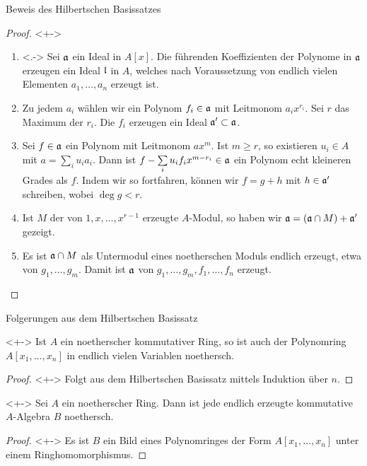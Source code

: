 \begin{frame}{Beweis des Hilbertschen Basissatzes}
	\begin{proof}<+->
		\begin{enumerate}[<+->]
		\item<.->
			Sei \(\mathfrak{a}\) ein Ideal in \(A[x]\). Die führenden Koeffizienten der
			Polynome in \(\mathfrak{a}\) erzeugen ein Ideal \(\mathfrak{l}\) in \(A\), welches
			nach Voraussetzung von endlich vielen Elementen \(a_1, \dotsc, a_n\) erzeugt ist.
		\item
			Zu jedem \(a_i\) wählen wir ein Polynom \(f_i \in \mathfrak{a}\) mit Leitmonom
			\(a_i x^{r_i}\). Sei \(r\) das Maximum der \(r_i\). Die \(f_i\)
			erzeugen ein Ideal \(\mathfrak{a}' \subset \mathfrak{a}\).
		\item
			Sei \(f \in \mathfrak{a}\) ein Polynom mit Leitmonom \(a x^m\).
			Ist \(m \ge r\), so existieren \(u_i \in A\) mit \(a = \sum\limits_i u_i a_i\).
			Dann ist \(f - \sum\limits_i u_i f_i x^{m - r_i} \in \mathfrak{a}\) ein Polynom echt kleineren Grades 
			als \(f\). Indem wir so fortfahren, können wir \(f = g + h\) mit \(h \in \mathfrak{a}'\)
			schreiben, wobei \(\deg g < r\).
		\item
			Ist \(M\) der von \(1, x, \dots, x^{r - 1}\) erzeugte \(A\)-Modul, so haben
			wir \(\mathfrak{a} = (\mathfrak{a} \cap M) + \mathfrak{a}'\) gezeigt.
		\item
			Es ist \(\mathfrak{a} \cap M\) als Untermodul eines noetherschen Moduls endlich erzeugt, 
			etwa von \(g_1, \dotsc, g_m\). Damit ist \(\mathfrak{a}\) von
			\(g_1, \dotsc, g_m, f_1, \dotsc, f_n\) erzeugt.
			\qedhere
		\end{enumerate}
	\end{proof}
\end{frame}

\begin{frame}{Folgerungen aus dem Hilbertschen Basissatz}
	\begin{corollary}<+->
		Ist \(A\) ein noetherscher kommutativer Ring, so ist auch der Polynomring \(A[x_1, \dotsc, x_n]\) in
		endlich vielen Variablen noethersch.
	\end{corollary}
	\begin{proof}<+->
		Folgt aus dem Hilbertschen Basissatz mittels Induktion über \(n\).
	\end{proof}
	\begin{corollary}<+->
		Sei \(A\) ein noetherscher Ring. Dann ist jede endlich erzeugte kommutative
		\(A\)-Algebra \(B\) noethersch.
	\end{corollary}
	\begin{proof}<+->
		Es ist \(B\) ein Bild eines Polynomringes der Form \(A[x_1, \dotsc, x_n]\) unter einem
		Ringhomomorphismus.
	\end{proof}
\end{frame}

